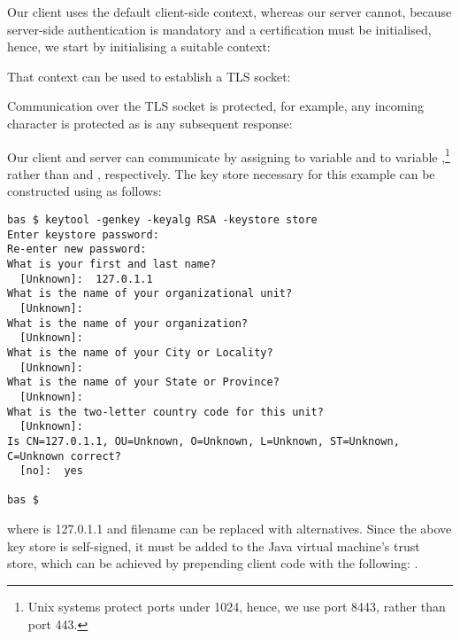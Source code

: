 Our client uses the default client-side context, whereas our server cannot, because 
server-side authentication is mandatory and a certification must be initialised, 
hence, we start by initialising a suitable context:



\noindent
That context can be used to establish a TLS socket:



\noindent
Communication over the TLS socket is protected, for example, any incoming character is
protected as is any subsequent response:



\noindent 
Our client and server can communicate by assigning  
to variable  and  to variable ,\footnote{Unix systems
  protect ports under 1024, hence, we use port 8443, rather than port 443.} 
rather than  and , respectively. The key 
store necessary for this example can be constructed using  as follows:

\begin{verbatim}
bas $ keytool -genkey -keyalg RSA -keystore store
Enter keystore password:  
Re-enter new password: 
What is your first and last name?
  [Unknown]:  127.0.1.1
What is the name of your organizational unit?
  [Unknown]:   
What is the name of your organization?
  [Unknown]:  
What is the name of your City or Locality?
  [Unknown]:  
What is the name of your State or Province?
  [Unknown]:  
What is the two-letter country code for this unit?
  [Unknown]:  
Is CN=127.0.1.1, OU=Unknown, O=Unknown, L=Unknown, ST=Unknown, C=Unknown correct?
  [no]:  yes

bas $
\end{verbatim}


\noindent
where  is 127.0.1.1 and filename  can 
be replaced with alternatives. Since the above key store is 
self-signed, it must be added to the Java virtual machine's trust store, which can 
be achieved by prepending client code with the following:
.









